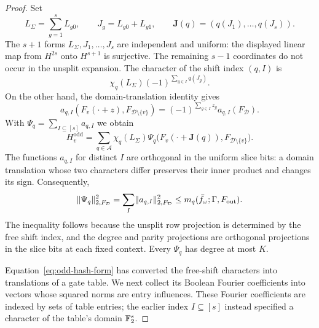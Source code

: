 \begin{proof}
Set
\[
 L_\Sigma=\sum_{g=1}^sL_{g0},\qquad J_g=L_{g0}+L_{g1},\qquad
 \mathbf J(q)=(q(J_1),\ldots,q(J_s)).
\]
The $s+1$ forms $L_\Sigma,J_1,\ldots,J_s$ are independent and uniform: the
displayed linear map from $H^{2s}$ onto $H^{s+1}$ is surjective. The
remaining $s-1$ coordinates do not occur in the unsplit expansion.
The character of the shift index $(q,I)$ is
\[
 \chi_q(L_\Sigma)(-1)^{\sum_{g\in I}q(J_g)}.
\]
On the other hand, the domain-translation identity gives
\[
 a_{q,I}(F_v(\cdot+z),F_{\mathcal D\setminus\{v\}})
 =(-1)^{\sum_{g\in I}z_g}a_{q,I}(F_{\mathcal D}).
\]
With $\Psi_q=\sum_{I\subseteq[s]}a_{q,I}$ we obtain
\begin{equation}\label{eq:odd-hash-form}
 H_v^{\mathrm{odd}}
 =\sum_{q\in\mathcal A}\chi_q(L_\Sigma)
 \Psi_q\bigl(F_v(\cdot+\mathbf J(q)),
                   F_{\mathcal D\setminus\{v\}}\bigr).
\end{equation}
The functions $a_{q,I}$ for distinct $I$ are orthogonal in the uniform
slice bits: a domain translation whose two characters differ preserves
their inner product and changes its sign. Consequently,
\begin{equation}\label{eq:psi-mass}
 \lVert\Psi_q\rVert_{2,F_{\mathcal D}}^2
 =\sum_I\lVert a_{q,I}\rVert_{2,F_{\mathcal D}}^2
 \le m_q(\bar f_\omega;\Gamma,F_{\mathrm{out}}).
\end{equation}
The inequality follows because the unsplit row projection is determined
by the free shift index, and the degree and parity projections are
orthogonal projections in the slice bits at each fixed context.
Every $\Psi_q$ has degree at most $K$.

Equation~\eqref{eq:odd-hash-form} has converted the free-shift characters
into translations of a gate table. We next collect its Boolean Fourier
coefficients into vectors whose squared norms are entry influences.
These Fourier coefficients are indexed by sets of table entries; the
earlier index $I\subseteq[s]$ instead specified a character of the
table's domain $\mathbb F_2^s$.


\end{proof}
